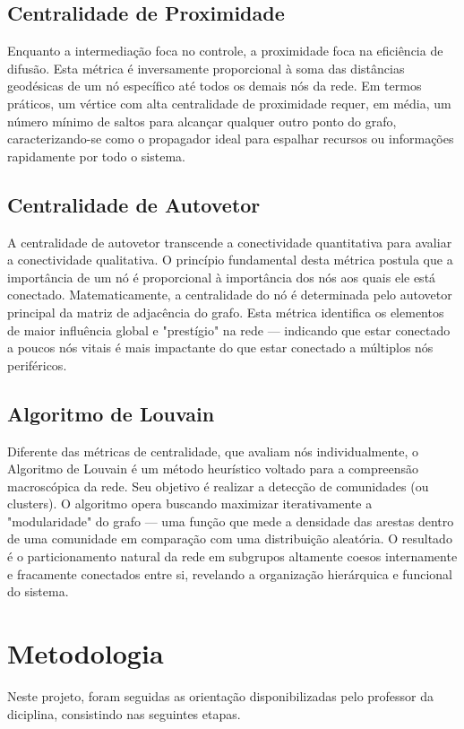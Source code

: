 \documentclass[journal]{IEEEtran}
\begin{document}
\subsection{Centralidade de Proximidade}
Enquanto a intermediação foca no controle, a proximidade foca na eficiência de difusão. Esta métrica é inversamente proporcional à soma das distâncias geodésicas de um nó específico até todos os demais nós da rede. Em termos práticos, um vértice com alta centralidade de proximidade requer, em média, um número mínimo de saltos para alcançar qualquer outro ponto do grafo, caracterizando-se como o propagador ideal para espalhar recursos ou informações rapidamente por todo o sistema.

\subsection{Centralidade de Autovetor}
A centralidade de autovetor transcende a conectividade quantitativa para avaliar a conectividade qualitativa. O princípio fundamental desta métrica postula que a importância de um nó é proporcional à importância dos nós aos quais ele está conectado. Matematicamente, a centralidade do nó é determinada pelo autovetor principal da matriz de adjacência do grafo. Esta métrica identifica os elementos de maior influência global e "prestígio" na rede — indicando que estar conectado a poucos nós vitais é mais impactante do que estar conectado a múltiplos nós periféricos.

\subsection{Algoritmo de Louvain}
Diferente das métricas de centralidade, que avaliam nós individualmente, o Algoritmo de Louvain é um método heurístico voltado para a compreensão macroscópica da rede. Seu objetivo é realizar a detecção de comunidades (ou clusters). O algoritmo opera buscando maximizar iterativamente a "modularidade" do grafo — uma função que mede a densidade das arestas dentro de uma comunidade em comparação com uma distribuição aleatória. O resultado é o particionamento natural da rede em subgrupos altamente coesos internamente e fracamente conectados entre si, revelando a organização hierárquica e funcional do sistema.


\section{Metodologia}
Neste projeto, foram seguidas as orientação disponibilizadas pelo professor da diciplina, consistindo nas seguintes etapas.
\end{document}
